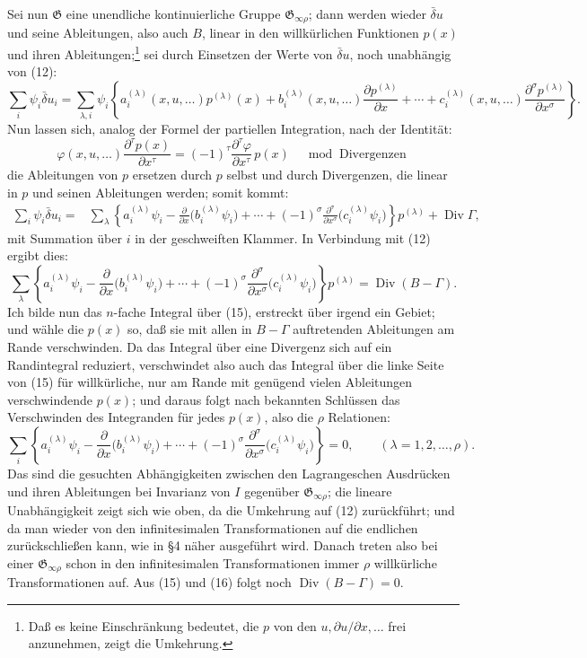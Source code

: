 \documentclass[11pt]{article}
\providecommand{\Div}{\operatorname{Div}}
\providecommand{\G}{\mathfrak G}
\providecommand{\bd}{\bar{\delta}}
\providecommand{\p}{\partial}
\providecommand{\p}{\partial}
\begin{document}
Sei nun \(\G\) eine unendliche kontinuierliche Gruppe \(\G_{\infty\rho}\); dann werden wieder \(\bd u\) und seine Ableitungen, also auch \(B\), linear in den willkürlichen Funktionen \(p(x)\) und ihren Ableitungen;\footnote{Daß es keine Einschränkung bedeutet, die \(p\) von den \(u,\p u/\p x,\ldots\) frei anzunehmen, zeigt die Umkehrung.} sei durch Einsetzen der Werte von \(\bd u\), noch unabhängig von (12):
\[
\sum_i\psi_i\bd u_i
=\sum_{\lambda,i}\psi_i\left\{
a_i^{(\lambda)}(x,u,\ldots)p^{(\lambda)}(x)
+b_i^{(\lambda)}(x,u,\ldots)\frac{\p p^{(\lambda)}}{\p x}
+\cdots+c_i^{(\lambda)}(x,u,\ldots)
\frac{\p^\sigma p^{(\lambda)}}{\p x^\sigma}\right\}.
\]
Nun lassen sich, analog der Formel der partiellen Integration, nach der Identität:
\[
\varphi(x,u,\ldots)\frac{\p^\tau p(x)}{\p x^\tau}
=(-1)^\tau\frac{\p^\tau\varphi}{\p x^\tau}\,p(x)
\quad \bmod \text{ Divergenzen}
\]
die Ableitungen von \(p\) ersetzen durch \(p\) selbst und durch Divergenzen, die linear in \(p\) und seinen Ableitungen werden; somit kommt:
\begin{equation}
\begin{aligned}
\sum_i\psi_i\bd u_i
={}&\sum_\lambda\left\{
a_i^{(\lambda)}\psi_i-\frac{\p}{\p x}\bigl(b_i^{(\lambda)}\psi_i\bigr)
+\cdots+(-1)^\sigma
\frac{\p^\sigma}{\p x^\sigma}\bigl(c_i^{(\lambda)}\psi_i\bigr)
\right\}p^{(\lambda)}+\Div\Gamma,
\end{aligned}
\tag{14}
\end{equation}
mit Summation über \(i\) in der geschweiften Klammer. In Verbindung mit (12) ergibt dies:
\begin{equation}
\sum_\lambda\left\{
a_i^{(\lambda)}\psi_i-\frac{\p}{\p x}\bigl(b_i^{(\lambda)}\psi_i\bigr)
+\cdots+(-1)^\sigma
\frac{\p^\sigma}{\p x^\sigma}\bigl(c_i^{(\lambda)}\psi_i\bigr)
\right\}p^{(\lambda)}
=\Div(B-\Gamma).
\tag{15}
\end{equation}
Ich bilde nun das \(n\)-fache Integral über (15), erstreckt über irgend ein Gebiet; und wähle die \(p(x)\) so, daß sie mit allen in \(B-\Gamma\) auftretenden Ableitungen am Rande verschwinden. Da das Integral über eine Divergenz sich auf ein Randintegral reduziert, verschwindet also auch das Integral über die linke Seite von (15) für willkürliche, nur am Rande mit genügend vielen Ableitungen verschwindende \(p(x)\); und daraus folgt nach bekannten Schlüssen das Verschwinden des Integranden für jedes \(p(x)\), also die \(\rho\) Relationen:
\begin{equation}
\sum_i\left\{
a_i^{(\lambda)}\psi_i-\frac{\p}{\p x}\bigl(b_i^{(\lambda)}\psi_i\bigr)
+\cdots+(-1)^\sigma
\frac{\p^\sigma}{\p x^\sigma}\bigl(c_i^{(\lambda)}\psi_i\bigr)
\right\}=0,\qquad(\lambda=1,2,\ldots,\rho).
\tag{16}
\end{equation}
Das sind die gesuchten Abhängigkeiten zwischen den Lagrangeschen Ausdrücken und ihren Ableitungen bei Invarianz von \(I\) gegenüber \(\G_{\infty\rho}\); die lineare Unabhängigkeit zeigt sich wie oben, da die Umkehrung auf (12) zurückführt; und da man wieder von den infinitesimalen Transformationen auf die endlichen zurückschließen kann, wie in \S{}4 näher ausgeführt wird. Danach treten also bei einer \(\G_{\infty\rho}\) schon in den infinitesimalen Transformationen immer \(\rho\) willkürliche Transformationen auf. Aus (15) und (16) folgt noch \(\Div(B-\Gamma)=0\).
\end{document}
